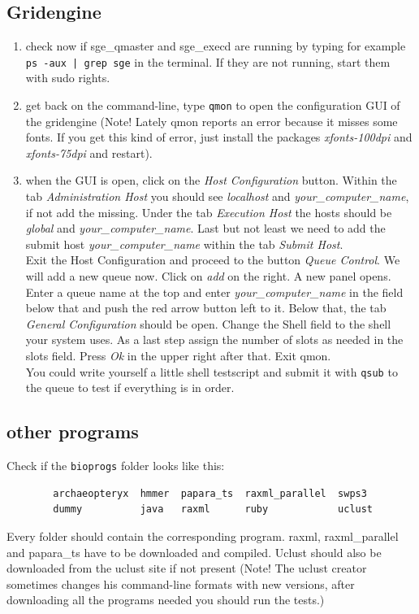 \documentclass{scrartcl}
\begin{document}
			\subsection{Gridengine}
			\begin{enumerate}
			\item check now if sge\_qmaster and sge\_execd are running by typing for example \texttt{ps -aux | grep sge} in the terminal. If they are not running, start them with sudo rights. 
			\item get back on the command-line, type \texttt{qmon} to open the configuration GUI of the gridengine (Note! Lately qmon reports an error because it misses some fonts. If you get this kind of error, just install the packages \textit{xfonts-100dpi} and \textit{xfonts-75dpi} and restart). 
			\item when the GUI is open, click on the \textit{Host Configuration} button. Within the tab \textit{Administration Host} you should see \textit{localhost} and \textit{your\_computer\_name}, if not add the missing. Under the tab \textit{Execution Host} the hosts should be \textit{global} and \textit{your\_computer\_name}. Last but not least we need to add the submit host \textit{your\_computer\_name} within the tab \textit{Submit Host}.\\ Exit the Host Configuration and proceed to the button \textit{Queue Control}. We will add a new queue now. Click on \textit{add} on the right. A new panel opens. Enter a queue name at the top and enter \textit{your\_computer\_name} in the field below that and push the red arrow button left to it. Below that, the tab \textit{General Configuration} should be open. Change the Shell field to the shell your system uses. As a last step assign the number of slots as needed in the slots field. Press \textit{Ok} in the upper right after that. Exit qmon. \\
			You could write yourself a little shell testscript and submit it with \texttt{qsub} to the queue to test if everything is in order.
		\end{enumerate}
		\subsection{other programs}
		Check if the \texttt{bioprogs} folder looks like this:
		\begin{verbatim}
		archaeopteryx  hmmer  papara_ts  raxml_parallel  swps3
		dummy          java   raxml      ruby            uclust
		\end{verbatim}
		Every folder should contain the corresponding program. raxml, raxml\_parallel and papara\_ts have to be downloaded and compiled. Uclust should also be downloaded from the uclust site if not present (Note! The uclust creator sometimes changes his command-line formats with new versions, after downloading all the programs needed you should run the tests.) 
\end{document}

